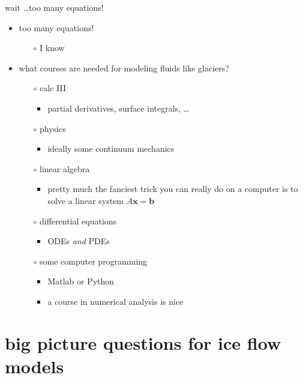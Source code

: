\documentclass[10pt,hyperref={pdfpagelabels=true}]{beamer}
\newcommand{\bb}{\mathbf{b}}
\newcommand{\bx}{\mathbf{x}}
\begin{document}
\begin{frame}{wait \dots too many equations!}

\begin{itemize}
\item too many equations!
    \begin{itemize}
    \item[$\circ$] I know
    \end{itemize}
\item<2> what courses are needed for modeling fluids like glaciers?
    \begin{itemize}
    \item[$\circ$] calc III
        \begin{itemize}
        \item partial derivatives, surface integrals, \dots
        \end{itemize}
    \item[$\circ$] physics
        \begin{itemize}
        \item ideally some continuum mechanics
        \end{itemize}
    \item[$\circ$] linear algebra
        \begin{itemize}
        \item pretty much the fanciest trick you can really do on a computer is to solve a linear system $A\bx = \bb$
        \end{itemize}
    \item[$\circ$] differential equations
        \begin{itemize}
        \item ODEs \emph{and} PDEs
        \end{itemize}
    \item[$\circ$] some computer programming
        \begin{itemize}
        \item Matlab or Python
        \item a course in numerical analysis is nice
        \end{itemize}
    \end{itemize}
\end{itemize}
\end{frame}


\section[big picture questions]{big picture questions for ice flow models}
\end{document}
